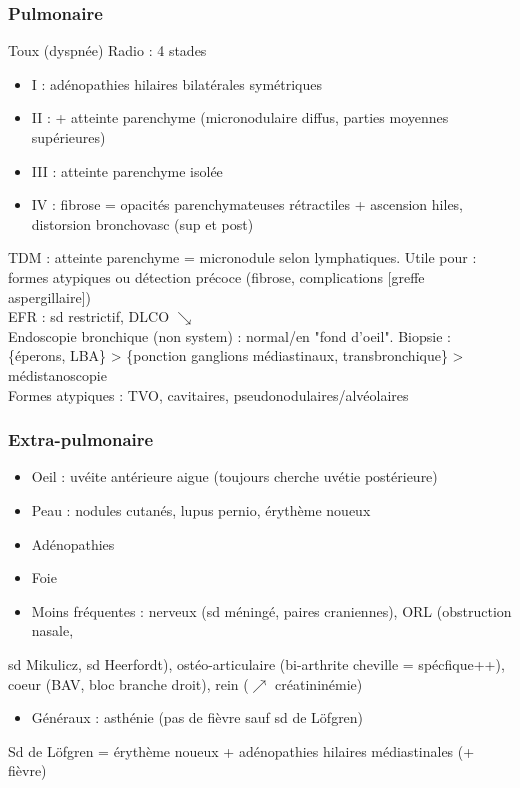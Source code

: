 \documentclass{article}
\begin{document}
\subsubsection{Pulmonaire}
\label{sec:org4ec1d7e}
Toux (dyspnée)
Radio : 4 stades
\begin{itemize}
\item I : adénopathies hilaires bilatérales symétriques
\item II : + atteinte parenchyme (micronodulaire diffus, parties moyennes supérieures)
\item III : atteinte parenchyme isolée
\item IV : fibrose = opacités parenchymateuses rétractiles + ascension hiles, distorsion bronchovasc (sup et post)
\end{itemize}
TDM : atteinte parenchyme = micronodule selon lymphatiques. Utile pour : formes atypiques ou détection précoce (fibrose, complications [greffe aspergillaire])\\
EFR : sd restrictif, DLCO $\searrow$\\
Endoscopie bronchique (non system) : normal/en "fond d'oeil". Biopsie : \{éperons, LBA\} > \{ponction ganglions médiastinaux, transbronchique\} > médistanoscopie\\
Formes atypiques : TVO, cavitaires, pseudonodulaires/alvéolaires

\subsubsection{Extra-pulmonaire}
\label{sec:org316c190}
\begin{itemize}
\item Oeil : uvéite antérieure aigue (toujours cherche uvétie postérieure)
\item Peau : nodules cutanés, lupus pernio, érythème noueux
\item Adénopathies
\item Foie
\item Moins fréquentes : nerveux (sd méningé, paires craniennes), ORL (obstruction
nasale,
\end{itemize}
sd Mikulicz, sd Heerfordt), ostéo-articulaire (bi-arthrite cheville =
spécfique++), 
coeur (BAV, bloc branche droit), rein (\(\nearrow\) créatininémie)
\begin{itemize}
\item Généraux : asthénie (pas de fièvre sauf sd de Löfgren)
\end{itemize}
Sd de Löfgren = érythème noueux + adénopathies hilaires médiastinales (+ fièvre)
\end{document}
